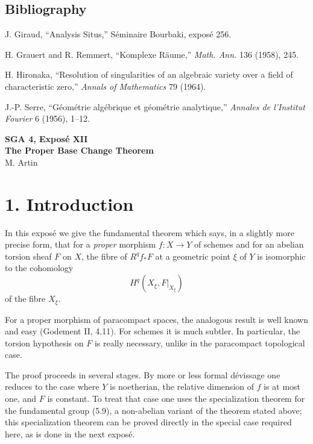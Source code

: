 \documentclass[11pt]{article}
\begin{document}
\subsection*{Bibliography}
\begin{enumerate}[label={[\arabic*]}]
\item J. Giraud, ``Analysis Situs,'' S\'eminaire Bourbaki, expos\'e 256.
\item H. Grauert and R. Remmert, ``Komplexe R\"aume,'' \emph{Math. Ann.} 136 (1958), 245.
\item H. Hironaka, ``Resolution of singularities of an algebraic variety over a field of characteristic zero,'' \emph{Annals of Mathematics} 79 (1964).
\item J.-P. Serre, ``G\'eom\'etrie alg\'ebrique et g\'eom\'etrie analytique,'' \emph{Annales de l'Institut Fourier} 6 (1956), 1--12.
\end{enumerate}


\clearpage
\begin{center}
{\Large \textbf{SGA 4, Expos\'e XII}}\\[0.35em]
{\large \textbf{The Proper Base Change Theorem}}\\[0.25em]
{\normalsize M. Artin}
\end{center}

\bigskip

\section*{1. Introduction}
In this expos\'e we give the fundamental theorem which says, in a slightly more precise form, that for a \emph{proper} morphism \(f:X\to Y\) of schemes and for an abelian torsion sheaf \(F\) on \(X\), the fibre of \(R^qf_*F\) at a geometric point \(\xi\) of \(Y\) is isomorphic to the cohomology
\[
H^q(X_\xi,F|_{X_\xi})
\]
of the fibre \(X_\xi\).

For a proper morphism of paracompact spaces, the analogous result is well known and easy (Godement II, 4.11). For schemes it is much subtler. In particular, the torsion hypothesis on \(F\) is really necessary, unlike in the paracompact topological case.

The proof proceeds in several stages. By more or less formal dévissage one reduces to the case where \(Y\) is noetherian, the relative dimension of \(f\) is at most one, and \(F\) is constant. To treat that case one uses the specialization theorem for the fundamental group (5.9), a non-abelian variant of the theorem stated above; this specialization theorem can be proved directly in the special case required here, as is done in the next expos\'e.
\end{document}
